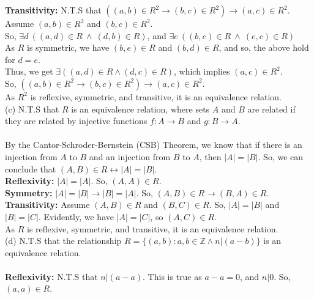 \documentclass[a4paper]{article}
\begin{document}
\begin{enumerate}
    \textbf{Transitivity:} N.T.S that $((a, b) \in R^2 \rightarrow (b, c) \in R^2) \rightarrow (a, c) \in R^2$.\\
    Assume $(a, b) \in R^2$ and  $(b, c) \in R^2$.\\
    
    So, $\exists d\ ((a, d) \in R\ \land\ (d, b) \in R)$, and $\exists e\ ((b, e) \in R\ \land\ (e, c) \in R)$\\
    As $R$ is symmetric, we have $(b, e) \in R$ and $(b, d) \in R$, and so, the above hold for $d = e$.\\
    Thus, we get $\exists ((a, d) \in R \land (d, c) \in R)$, which implies $(a, c) \in R^2$.\\
    So, $((a, b) \in R^2 \rightarrow (b, c) \in R^2) \rightarrow (a, c) \in R^2$.\\

    As $R^2$ is reflexive, symmetric, and transitive, it is an equivalence relation.\\

    (c) N.T.S that $R$ is an equivalence relation, where sets $A$ and $B$ are related if they are related by injective functions $f: A \rightarrow B$ and $g: B \rightarrow A$.\\
    \\
    By the Cantor-Schroder-Bernstein (CSB) Theorem, we know that if there is an injection from $A$ to $B$ and an injection from $B$ to $A$, then $|A| = |B|$. So, we can conclude that $(A, B) \in R \leftrightarrow |A| = |B|$.\\

    \textbf{Reflexivity:} $|A| = |A|$. So, $(A, A) \in R$.\\

    \textbf{Symmetry:} $|A| = |B| \rightarrow |B| = |A|$. So, $(A, B) \in R \rightarrow (B, A) \in R$.\\

    \textbf{Transitivity:} Assume $(A, B) \in R$ and $(B, C) \in R$. So, $|A| = |B|$ and $|B| = |C|$. Evidently, we have $|A| = |C|$, so $(A, C) \in R$.\\

    As $R$ is reflexive, symmetric, and transitive, it is an equivalence relation.\\

    (d) N.T.S that the relationship $R = \{(a, b) : a, b \in \mathbb{Z} \land n|(a-b)\}$ is an equivalence relation.\\
    \\
    \textbf{Reflexivity:} N.T.S that $n|(a-a)$. This is true as $a-a=0$, and $n|0$. So, $(a, a) \in R$.\\


\end{enumerate}
\end{document}
